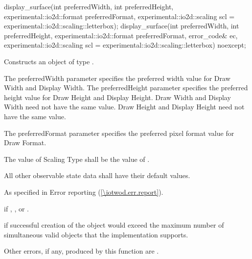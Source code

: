 \begin{itemdecl}
display_surface(int preferredWidth, int preferredHeight, 
  experimental::io2d::format preferredFormat,
  experimental::io2d::scaling scl = experimental::io2d::scaling::letterbox);
display_surface(int preferredWidth, int preferredHeight, 
  experimental::io2d::format preferredFormat, error_code& ec,
  experimental::io2d::scaling scl = experimental::io2d::scaling::letterbox)
  noexcept;
\end{itemdecl}
\begin{itemdescr}
\pnum
\effects
Constructs an object of type .

\pnum
The preferredWidth parameter specifies the preferred width value for Draw Width and Display Width. The preferredHeight parameter specifies the preferred height value for Draw Height and Display Height. Draw Width and Display Width need not have the same value. Draw Height and Display Height need not have the same value.

\pnum
The preferredFormat parameter specifies the preferred pixel format value for Draw Format.

\pnum
The value of Scaling Type shall be the value of .

\pnum
All other observable state data shall have their default values.

\pnum
\throws
As specified in Error reporting (\ref{\iotwod.err.report}).

\pnum
\errors
{} if , , or .

 if successful creation of the  object would exceed the maximum number of simultaneous valid  objects that the implementation supports.

\pnum
Other errors, if any, produced by this function are .
\end{itemdescr}

